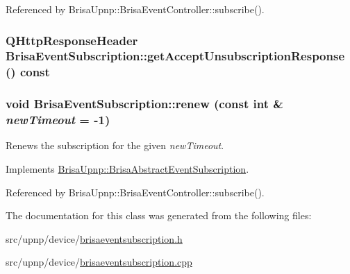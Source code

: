 Referenced by BrisaUpnp::BrisaEventController::subscribe().\hypertarget{classBrisaUpnp_1_1BrisaEventSubscription_a07a86edf216d8002832956465041f759}{
\subsubsection[{getAcceptUnsubscriptionResponse}]{\setlength{\rightskip}{0pt plus 5cm}QHttpResponseHeader BrisaEventSubscription::getAcceptUnsubscriptionResponse () const}}
\label{classBrisaUpnp_1_1BrisaEventSubscription_a07a86edf216d8002832956465041f759}
\hypertarget{classBrisaUpnp_1_1BrisaEventSubscription_aa5b51ef428760a2f3e653e9b4b132f5a}{
\subsubsection[{renew}]{\setlength{\rightskip}{0pt plus 5cm}void BrisaEventSubscription::renew (const int \& {\em newTimeout} = {\ttfamily -\/1})}}
\label{classBrisaUpnp_1_1BrisaEventSubscription_aa5b51ef428760a2f3e653e9b4b132f5a}


Renews the subscription for the given {\itshape newTimeout\/}. 

Implements \hyperlink{classBrisaUpnp_1_1BrisaAbstractEventSubscription_ae9da94244c6164b5759b8be21e03d42f}{BrisaUpnp::BrisaAbstractEventSubscription}.

Referenced by BrisaUpnp::BrisaEventController::subscribe().

The documentation for this class was generated from the following files:\begin{DoxyCompactItemize}
\item 
src/upnp/device/\hyperlink{brisaeventsubscription_8h}{brisaeventsubscription.h}\item 
src/upnp/device/\hyperlink{brisaeventsubscription_8cpp}{brisaeventsubscription.cpp}\end{DoxyCompactItemize}
